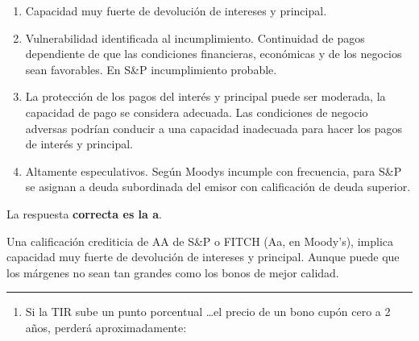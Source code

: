 \documentclass[
  letterpaper,
  DIV=11,
  numbers=noendperiod]{scrreprt}
\providecommand{\tightlist}{%
  \setlength{\itemsep}{0pt}\setlength{\parskip}{0pt}}\usepackage{longtable,booktabs,array}
\begin{document}
\begin{enumerate}
\def\labelenumi{\alph{enumi})}
\item
  Capacidad muy fuerte de devolución de intereses y principal.
\item
  Vulnerabilidad identificada al incumplimiento. Continuidad de pagos
  dependiente de que las condiciones financieras, económicas y de los
  negocios sean favorables. En S\&P incumplimiento probable.
\item
  La protección de los pagos del interés y principal puede ser moderada,
  la capacidad de pago se considera adecuada. Las condiciones de negocio
  adversas podrían conducir a una capacidad inadecuada para hacer los
  pagos de interés y principal.
\item
  Altamente especulativos. Según Moodys incumple con frecuencia, para
  S\&P se asignan a deuda subordinada del emisor con calificación de
  deuda superior.
\end{enumerate}

\begin{tcolorbox}[enhanced jigsaw, left=2mm, opacityback=0, colback=white, breakable, arc=.35mm, bottomrule=.15mm, rightrule=.15mm, toprule=.15mm, leftrule=.75mm, colframe=quarto-callout-tip-color-frame]
\begin{minipage}[t]{5.5mm}
\textcolor{quarto-callout-tip-color}{\faLightbulb}
\end{minipage}%
\begin{minipage}[t]{\textwidth - 5.5mm}

La respuesta \textbf{correcta es la a}.

Una calificación crediticia de AA de S\&P o FITCH (Aa, en Moody's),
implica capacidad muy fuerte de devolución de intereses y principal.
Aunque puede que los márgenes no sean tan grandes como los bonos de
mejor calidad.

\end{minipage}%
\end{tcolorbox}

\begin{center}\rule{0.5\linewidth}{0.5pt}\end{center}

\begin{enumerate}
\def\labelenumi{\arabic{enumi}.}
\setcounter{enumi}{99}
\tightlist
\item
  Si la TIR sube un punto porcentual \ldots el precio de un bono cupón
  cero a 2 años, perderá aproximadamente:
\end{enumerate}
\end{document}
